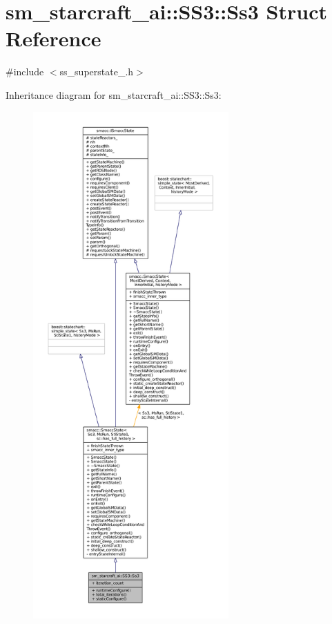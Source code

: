 \hypertarget{structsm__starcraft__ai_1_1SS3_1_1Ss3}{}\section{sm\+\_\+starcraft\+\_\+ai\+:\+:S\+S3\+:\+:Ss3 Struct Reference}
\label{structsm__starcraft__ai_1_1SS3_1_1Ss3}


{\ttfamily \#include $<$ss\+\_\+superstate\+\_.\+h$>$}



Inheritance diagram for sm\+\_\+starcraft\+\_\+ai\+:\+:S\+S3\+:\+:Ss3\+:
\nopagebreak
\begin{figure}[H]
\begin{center}
\leavevmode
\includegraphics[height=550pt]{structsm__starcraft__ai_1_1SS3_1_1Ss3__inherit__graph}
\end{center}
\end{figure}


